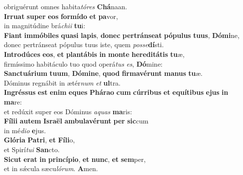 \evenverse obriguérunt omnes habita\textit{tó}\textit{res} \textbf{Chá}naan.\\
\oddverse \textbf{Ir}\textbf{ru}\textbf{at} \textbf{su}\textbf{per} \textbf{e}\textbf{os} \textbf{for}\textbf{mí}\textbf{do} \textbf{et} \textbf{pa}vor,~\*\\
\oddverse in magnitúdine brá\textit{chi}\textit{i} \textbf{tu}i:\\
\evenverse \textbf{Fi}\textbf{ant} \textbf{im}\textbf{mó}\textbf{bi}\textbf{les} \textbf{qua}\textbf{si} \textbf{la}\textbf{pis}, \textbf{do}\textbf{nec} \textbf{per}\textbf{trán}\textbf{se}\textbf{at} \textbf{pó}\textbf{pu}\textbf{lus} \textbf{tu}\textbf{us}, \textbf{Dó}\textbf{mi}ne,~\*\\
\evenverse donec pertránseat pópulus tuus iste, quem \textit{pos}\textit{se}\textbf{dí}sti.\\
\oddverse \textbf{In}\textbf{tro}\textbf{dú}\textbf{ces} \textbf{e}\textbf{os}, \textbf{et} \textbf{plan}\textbf{tá}\textbf{bis} \textbf{in} \textbf{mon}\textbf{te} \textbf{he}\textbf{re}\textbf{di}\textbf{tá}\textbf{tis} \textbf{tu}æ,~\*\\
\oddverse firmíssimo habitáculo tuo quod operá\textit{tus} \textit{es}, \textbf{Dó}mine:\\
\evenverse \textbf{San}\textbf{ctu}\textbf{á}\textbf{ri}\textbf{um} \textbf{tu}\textbf{um}, \textbf{Dó}\textbf{mi}\textbf{ne}, \textbf{quod} \textbf{fir}\textbf{ma}\textbf{vé}\textbf{runt} \textbf{ma}\textbf{nus} \textbf{tu}æ.~\*\\
\evenverse Dóminus regnábit in ætér\textit{num} \textit{et} \textbf{ul}tra.\\
\oddverse \textbf{In}\textbf{grés}\textbf{sus} \textbf{est} \textbf{e}\textbf{nim} \textbf{e}\textbf{ques} \textbf{Phá}\textbf{ra}\textbf{o} \textbf{cum} \textbf{cúr}\textbf{ri}\textbf{bus} \textbf{et} \textbf{e}\textbf{quí}\textbf{ti}\textbf{bus} \textbf{e}\textbf{jus} \textbf{in} \textbf{ma}re:~\*\\
\oddverse et redúxit super eos Dóminus \textit{a}\textit{quas} \textbf{ma}ris:\\
\evenverse \textbf{Fí}\textbf{li}\textbf{i} \textbf{au}\textbf{tem} \textbf{Is}\textbf{ra}\textbf{ël} \textbf{am}\textbf{bu}\textbf{la}\textbf{vé}\textbf{runt} \textbf{per} \textbf{sic}cum~\*\\
\evenverse in mé\textit{di}\textit{o} \textbf{e}jus.\\
\oddverse \textbf{Gló}\textbf{ri}\textbf{a} \textbf{Pa}\textbf{tri}, \textbf{et} \textbf{Fí}\textbf{li}o,~\*\\
\oddverse et Spirí\textit{tu}\textit{i} \textbf{San}cto.\\
\evenverse \textbf{Si}\textbf{cut} \textbf{e}\textbf{rat} \textbf{in} \textbf{prin}\textbf{cí}\textbf{pi}\textbf{o}, \textbf{et} \textbf{nunc}, \textbf{et} \textbf{sem}per,~\*\\
\evenverse et in sǽcula sæcu\textit{ló}\textit{rum}. \textbf{A}men.\\
